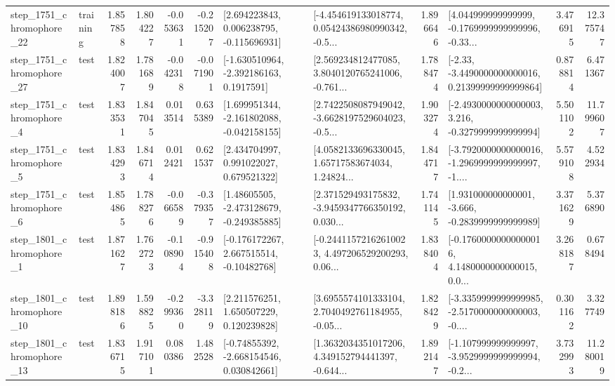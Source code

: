 \begin{tabular}{llrrrrllrlrr}
 step\_1751\_chromophore\_22 &  training &      1.857858 &    1.804227 &     -0.053631 & -0.215207 &    [2.694223843, 0.006238795, -0.115696931] &  [-4.454619133018774, 0.05424386980990342, -0.5... &       1.896646 &  [4.044999999999999, -0.1769999999999996, -0.33... &            3.476915 &         12.375747 \\
 step\_1751\_chromophore\_27 &      test &      1.824007 &    1.781689 &     -0.042318 & -0.071901 &     [-1.630510964, -2.392186163, 0.1917591] &  [2.569234812477085, 3.8040120765241006, -0.761... &       1.788474 &  [-2.33, -3.4490000000000016, 0.21399999999999864] &            0.878814 &          6.471367 \\
  step\_1751\_chromophore\_4 &      test &      1.833531 &    1.847045 &      0.013514 &  0.635389 &   [1.699951344, -2.161802088, -0.042158155] &  [2.7422508087949042, -3.6628197529604023, -0.5... &       1.903274 &  [-2.4930000000000003, 3.216, -0.3279999999999994] &            5.501102 &         11.799607 \\
  step\_1751\_chromophore\_5 &      test &      1.834293 &    1.846714 &      0.012421 &  0.621537 &     [2.434704997, 0.991022027, 0.679521322] &  [4.0582133696330045, 1.65717583674034, 1.24824... &       1.844717 &  [-3.7920000000000016, -1.2969999999999997, -1.... &            5.579108 &          4.522934 \\
  step\_1751\_chromophore\_6 &      test &      1.854865 &    1.788276 &     -0.066589 & -0.379357 &    [1.48605505, -2.473128679, -0.249385885] &  [2.371529493175832, -3.9459347766350192, 0.030... &       1.741145 &   [1.931000000000001, -3.666, -0.2839999999999989] &            3.371629 &          5.376890 \\
  step\_1801\_chromophore\_1 &      test &      1.871627 &    1.762723 &     -0.108904 & -0.915408 &    [-0.176172267, 2.667515514, -0.10482768] &  [-0.24411572162610023, 4.497206529200293, 0.06... &       1.838404 &  [-0.17600000000000016, 4.1480000000000015, 0.0... &            3.268187 &          0.678494 \\
 step\_1801\_chromophore\_10 &      test &      1.898186 &    1.598825 &     -0.299360 & -3.328119 &     [2.211576251, 1.650507229, 0.120239828] &  [3.6955574101333104, 2.7040492761184955, -0.05... &       1.828429 &  [-3.3359999999999985, -2.5170000000000003, -0.... &            0.301162 &          3.327749 \\
 step\_1801\_chromophore\_13 &      test &      1.836715 &    1.917101 &      0.080386 &  1.482528 &    [-0.74855392, -2.668154546, 0.030842661] &  [1.3632034351017206, 4.349152794441397, -0.644... &       1.892147 &  [-1.107999999999997, -3.9529999999999994, -0.2... &            3.732993 &         11.280019 \\

\end{tabular}
